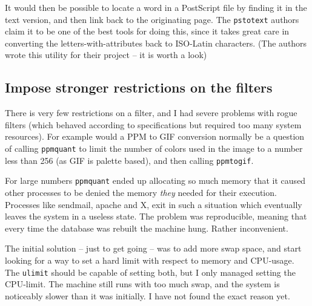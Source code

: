 It would then be possible to locate a word in a PostScript file by
finding it in the text version, and then link back to the originating
page.  The \texttt{pstotext} authors claim it to be one of the best
tools for doing this, since it takes great care in converting the
letters-with-attributes back to ISO-Latin characters.  (The authors
wrote this utility for their
 project -- it is worth a look)


\subsection*{Impose stronger restrictions on the filters}

There is very few restrictions on a filter, and I had severe problems
with rogue filters (which behaved according to specifications but
required too many system resources).  For example would a PPM to GIF
conversion normally be a question of calling \texttt{ppmquant} to
limit the number of colors used in the image to a number less than 256
(as GIF is palette based), and then calling \texttt{ppmtogif}.

For large numbers \texttt{ppmquant} ended up allocating so much memory
that it caused other processes to be denied the memory \textit{they}
needed for their execution.  Processes like sendmail, apache and X,
exit in such a situation which eventually leaves the system in a
useless state.  The problem was reproducible, meaning that every time
the database was rebuilt the machine hung.  Rather inconvenient.

The initial solution -- just to get going -- was to add more swap
space, and start looking for a way to set a hard limit with respect to
memory and CPU-usage.  The \texttt{ulimit} should be capable of
setting both, but I only managed setting the CPU-limit.  The machine
still runs with too much swap, and the system is noticeably slower than
it was initially.    I have not found the exact reason yet. 












